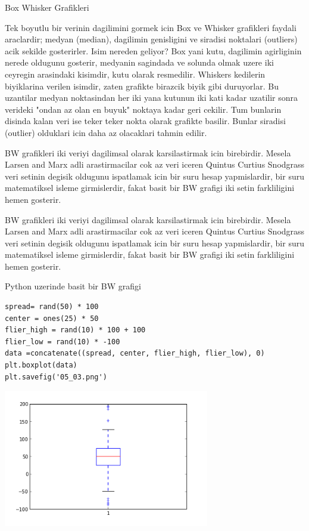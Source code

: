 \documentclass[12pt,fleqn]{article}\usepackage{../common}
\begin{document}
Box Whisker Grafikleri

Tek boyutlu bir verinin dagilimini gormek icin Box ve Whisker grafikleri
faydali araclardir; medyan (median), dagilimin genisligini ve siradisi
noktalari (outliers) acik sekilde gosterirler. Isim nereden geliyor? Box
yani kutu, dagilimin agirliginin nerede oldugunu gosterir, medyanin
sagindada ve solunda olmak uzere iki ceyregin arasindaki kisimdir, kutu
olarak resmedilir. Whiskers kedilerin biyiklarina verilen isimdir, zaten
grafikte birazcik biyik gibi duruyorlar. Bu uzantilar medyan noktasindan
her iki yana kutunun iki kati kadar uzatilir sonra verideki "ondan az olan
en buyuk" noktaya kadar geri cekilir. Tum bunlarin disinda kalan veri ise
teker teker nokta olarak grafikte basilir. Bunlar siradisi (outlier)
olduklari icin daha az olacaklari tahmin edilir.

BW grafikleri iki veriyi dagilimsal olarak karsilastirmak icin
birebirdir. Mesela Larsen and Marx adli arastirmacilar cok az veri
iceren Quintus Curtius Snodgrass veri setinin degisik oldugunu
ispatlamak icin bir suru hesap yapmislardir, bir suru matematiksel
isleme girmislerdir, fakat basit bir BW grafigi iki setin farkliligini
hemen gosterir.

BW grafikleri iki veriyi dagilimsal olarak karsilastirmak icin
birebirdir. Mesela Larsen and Marx adli arastirmacilar cok az veri
iceren Quintus Curtius Snodgrass veri setinin degisik oldugunu
ispatlamak icin bir suru hesap yapmislardir, bir suru matematiksel
isleme girmislerdir, fakat basit bir BW grafigi iki setin farkliligini
hemen gosterir.

Python uzerinde basit bir BW grafigi 

\begin{verbatim}
spread= rand(50) * 100
center = ones(25) * 50
flier_high = rand(10) * 100 + 100
flier_low = rand(10) * -100
data =concatenate((spread, center, flier_high, flier_low), 0)
plt.boxplot(data)
plt.savefig('05_03.png')
\end{verbatim}

\includegraphics[height=6cm]{05_03.png}
\end{document}
